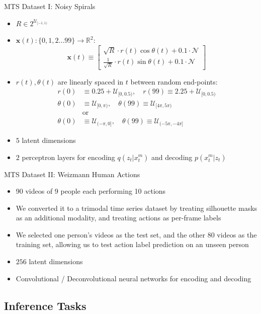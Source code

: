 \documentclass{beamer}
\begin{document}
\begin{frame}{MTS Dataset I: Noisy Spirals}
\begin{itemize}
\item $R\in2^{\mathcal{U}_{[-1,1)}}$
\item $\mathbf{x}(t):\{0,1,2\dots99\}\to\mathbb{R}^2$:\[
\mathbf{x}(t)\equiv\begin{bmatrix}
\sqrt{R}\cdot r(t)\cos\theta(t)+0.1\cdot\mathcal{N}\\
\frac{1}{\sqrt{R}}\cdot r(t)\sin\theta(t)+0.1\cdot\mathcal{N}
\end{bmatrix}
\]
\item $r(t),\theta(t)$ are linearly spaced in $t$ between random end-points:\[
\begin{split}
r(0)&\equiv0.25+\mathcal{U}_{[0,0.5)},\quad r(99)\equiv2.25+\mathcal{U}_{[0,0.5)}\\
\theta(0)&\equiv\mathcal{U}_{[0,\pi)},\quad\theta(99)\equiv\mathcal{U}_{[4\pi,5\pi)}\\
&\text{or}\\
\theta(0)&\equiv\mathcal{U}_{(-\pi,0]},\quad\theta(99)\equiv\mathcal{U}_{(-5\pi,-4\pi]}
\end{split}
\]
\item $5$ latent dimensions
\item $2$ perceptron layers for encoding $q(z_t|x_t^m)$ and decoding $p(x_t^m|z_t)$
\end{itemize}
\end{frame}

\begin{frame}{MTS Dataset II: Weizmann Human Actions}
\begin{itemize}
\item 90 videos of 9 people each performing 10 actions
\item We converted it to a trimodal time series dataset by treating silhouette masks as an additional modality, and treating actions as per-frame labels
\item We selected one person's videos as the test set, and the other 80 videos as the training set, allowing us to test action label prediction on an unseen person
\item $256$ latent dimensions
\item Convolutional / Deconvolutional neural networks for encoding and decoding
\end{itemize}
\end{frame}


\subsection{Inference Tasks}
\end{document}
